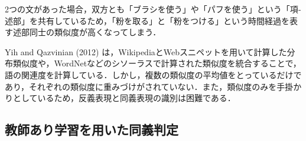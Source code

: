 \documentclass[japanese]{jnlp_1.4}
\begin{document}
2つの文があった場合，双方とも「ブラシを使う」や「パフを使う」という「項‐述部」を共有しているため，「粉を取る」と「粉をつける」という時間経過を表す述部同士の類似度が高くなってしまう．

Yih and Qazvinian (2012) は，WikipediaとWebスニペットを用いて計算した分布類似度や，WordNetなどのシソーラスで計算された類似度を統合することで，語の関連度を計算している．しかし，複数の類似度の平均値をとっているだけであり，それぞれの類似度に重みづけがされていない．また，類似度のみを手掛かりとしているため，反義表現と同義表現の識別は困難である． 



\subsection{教師あり学習を用いた同義判定}
\end{document}

